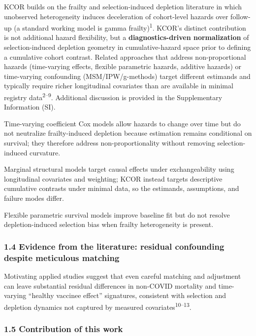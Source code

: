 \documentclass[
]{article}
\begin{document}
KCOR builds on the frailty and selection-induced depletion literature in
which unobserved heterogeneity induces deceleration of cohort-level
hazards over follow-up (a standard working model is gamma
frailty)\textsuperscript{1}. KCOR's distinct contribution is not
additional hazard flexibility, but a \textbf{diagnostics-driven
normalization} of selection-induced depletion geometry in
cumulative-hazard space prior to defining a cumulative cohort contrast.
Related approaches that address non-proportional hazards (time-varying
effects, flexible parametric hazards, additive hazards) or time-varying
confounding (MSM/IPW/g-methods) target different estimands and typically
require richer longitudinal covariates than are available in minimal
registry data\textsuperscript{2--9}. Additional discussion is provided
in the Supplementary Information (SI).

Time-varying coefficient Cox models allow hazards to change over time
but do not neutralize frailty-induced depletion because estimation
remains conditional on survival; they therefore address
non-proportionality without removing selection-induced curvature.

Marginal structural models target causal effects under exchangeability
using longitudinal covariates and weighting; KCOR instead targets
descriptive cumulative contrasts under minimal data, so the estimands,
assumptions, and failure modes differ.

Flexible parametric survival models improve baseline fit but do not
resolve depletion-induced selection bias when frailty heterogeneity is
present.

\subsubsection{1.4 Evidence from the literature: residual confounding
despite meticulous
matching}\label{evidence-from-the-literature-residual-confounding-despite-meticulous-matching}

Motivating applied studies suggest that even careful matching and
adjustment can leave substantial residual differences in non-COVID
mortality and time-varying ``healthy vaccinee effect'' signatures,
consistent with selection and depletion dynamics not captured by
measured covariates\textsuperscript{10--13}.

\subsubsection{1.5 Contribution of this
work}\label{contribution-of-this-work}
\end{document}
